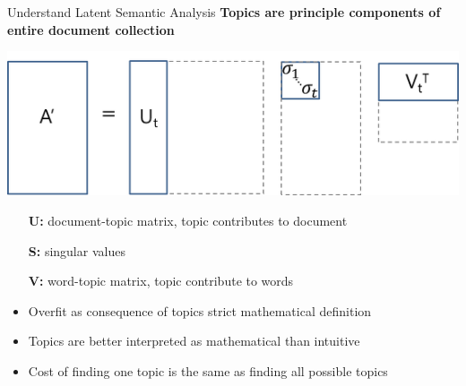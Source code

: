 \documentclass[10pt]{beamer}
\begin{document}
\begin{frame}{Understand Latent Semantic Analysis}
  {\bf Topics are principle components of entire document collection}

  \begin{multicols}{2}
    \includegraphics[width=\columnwidth]{svd.png}
    \columnbreak

    \begin{itemize}
      \item[{\bf U:}] document-topic matrix, topic contributes to document
      \item[{\bf S:}] singular values
      \item[{\bf V:}] word-topic matrix, topic contribute to words
    \end{itemize}
  \end{multicols}

  \begin{itemize}
  \item Overfit as consequence of topics strict mathematical definition
  \item Topics are better interpreted as mathematical than intuitive
  \item Cost of finding one topic is the same as finding all possible topics
  \end{itemize}
\end{frame}
\end{document}
